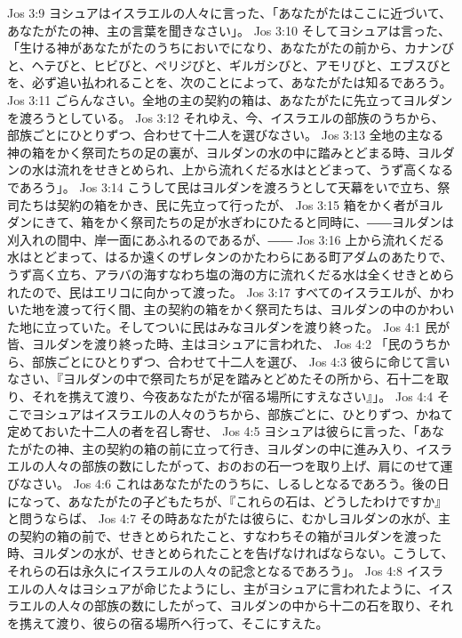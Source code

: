 Jos 3:9  ヨシュアはイスラエルの人々に言った、「あなたがたはここに近づいて、あなたがたの神、主の言葉を聞きなさい」。
Jos 3:10  そしてヨシュアは言った、「生ける神があなたがたのうちにおいでになり、あなたがたの前から、カナンびと、ヘテびと、ヒビびと、ペリジびと、ギルガシびと、アモリびと、エブスびとを、必ず追い払われることを、次のことによって、あなたがたは知るであろう。
Jos 3:11  ごらんなさい。全地の主の契約の箱は、あなたがたに先立ってヨルダンを渡ろうとしている。
Jos 3:12  それゆえ、今、イスラエルの部族のうちから、部族ごとにひとりずつ、合わせて十二人を選びなさい。
Jos 3:13  全地の主なる神の箱をかく祭司たちの足の裏が、ヨルダンの水の中に踏みとどまる時、ヨルダンの水は流れをせきとめられ、上から流れくだる水はとどまって、うず高くなるであろう」。
Jos 3:14  こうして民はヨルダンを渡ろうとして天幕をいで立ち、祭司たちは契約の箱をかき、民に先立って行ったが、
Jos 3:15  箱をかく者がヨルダンにきて、箱をかく祭司たちの足が水ぎわにひたると同時に、――ヨルダンは刈入れの間中、岸一面にあふれるのであるが、――
Jos 3:16  上から流れくだる水はとどまって、はるか遠くのザレタンのかたわらにある町アダムのあたりで、うず高く立ち、アラバの海すなわち塩の海の方に流れくだる水は全くせきとめられたので、民はエリコに向かって渡った。
Jos 3:17  すべてのイスラエルが、かわいた地を渡って行く間、主の契約の箱をかく祭司たちは、ヨルダンの中のかわいた地に立っていた。そしてついに民はみなヨルダンを渡り終った。
Jos 4:1  民が皆、ヨルダンを渡り終った時、主はヨシュアに言われた、
Jos 4:2  「民のうちから、部族ごとにひとりずつ、合わせて十二人を選び、
Jos 4:3  彼らに命じて言いなさい、『ヨルダンの中で祭司たちが足を踏みとどめたその所から、石十二を取り、それを携えて渡り、今夜あなたがたが宿る場所にすえなさい』」。
Jos 4:4  そこでヨシュアはイスラエルの人々のうちから、部族ごとに、ひとりずつ、かねて定めておいた十二人の者を召し寄せ、
Jos 4:5  ヨシュアは彼らに言った、「あなたがたの神、主の契約の箱の前に立って行き、ヨルダンの中に進み入り、イスラエルの人々の部族の数にしたがって、おのおの石一つを取り上げ、肩にのせて運びなさい。
Jos 4:6  これはあなたがたのうちに、しるしとなるであろう。後の日になって、あなたがたの子どもたちが、『これらの石は、どうしたわけですか』と問うならば、
Jos 4:7  その時あなたがたは彼らに、むかしヨルダンの水が、主の契約の箱の前で、せきとめられたこと、すなわちその箱がヨルダンを渡った時、ヨルダンの水が、せきとめられたことを告げなければならない。こうして、それらの石は永久にイスラエルの人々の記念となるであろう」。
Jos 4:8  イスラエルの人々はヨシュアが命じたようにし、主がヨシュアに言われたように、イスラエルの人々の部族の数にしたがって、ヨルダンの中から十二の石を取り、それを携えて渡り、彼らの宿る場所へ行って、そこにすえた。
